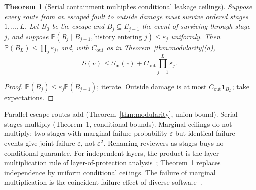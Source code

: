 \documentclass[11pt]{article}
\newtheorem{theorem}{Theorem}
\theoremstyle{definition}
\theoremstyle{remark}
\newcommand{\Prb}{\mathbb P}
\newcommand{\ind}{\mathbf 1}
\begin{document}
\begin{theorem}[Serial containment multiplies conditional leakage ceilings]\label{thm:serial}
Suppose every route from an escaped fault to outside damage must survive ordered stages $1,\dots,L$.
Let $B_0$ be the escape and $B_j\subseteq B_{j-1}$ the event of surviving through stage $j$, and
suppose $\Prb(B_j\mid B_{j-1},\text{history entering }j)\le\varepsilon_j$ uniformly. Then
$\Prb(B_L)\le\prod_j\varepsilon_j$, and, with $C_{\mathrm{out}}$ as in
Theorem~\ref{thm:modularity}(a),
\[
S(v)\le S_{\mathrm{in}}(v)+C_{\mathrm{out}}\prod_{j=1}^L\varepsilon_j .
\]
\end{theorem}
\begin{proof}
$\Prb(B_j)\le\varepsilon_j\Prb(B_{j-1})$; iterate. Outside damage is at most
$C_{\mathrm{out}}\ind_{B_L}$; take expectations.
\end{proof}
Parallel escape routes add (Theorem~\ref{thm:modularity}, union bound). Serial stages multiply
(Theorem~\ref{thm:serial}, conditional bounds). Marginal ceilings do not multiply: two stages with
marginal failure probability $\varepsilon$ but identical failure events give joint failure
$\varepsilon$, not $\varepsilon^2$. Renaming reviewers as stages buys no conditional guarantee.
For independent layers, the product is the layer-multiplication rule of layer-of-protection
analysis~\cite{lopa}; Theorem~\ref{thm:serial} replaces independence by uniform conditional ceilings.
The failure of marginal multiplication is the coincident-failure effect of diverse
software~\cite{eckhardt85,littlewood89}.
\end{document}
